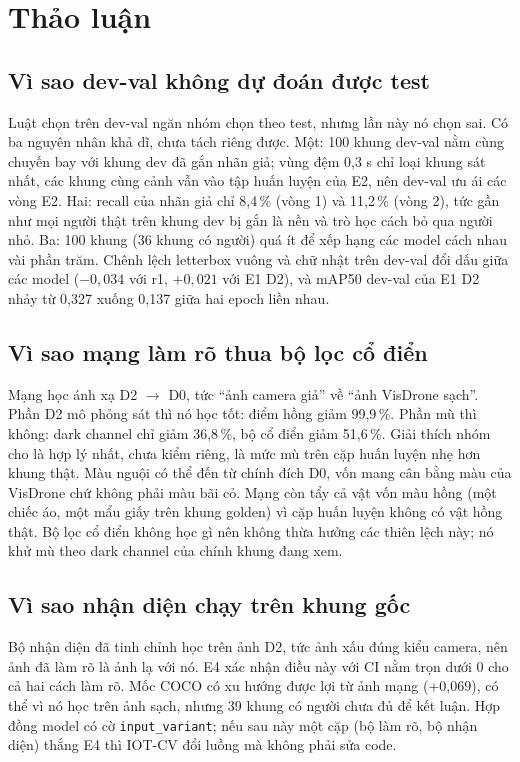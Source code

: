 \section{Thảo luận}\label{sec:thao-luan}

\subsection{Vì sao dev-val không dự đoán được test}

Luật chọn trên dev-val ngăn nhóm chọn theo test, nhưng lần này nó chọn sai. Có ba nguyên nhân khả dĩ, chưa tách riêng được. Một: 100 khung dev-val nằm cùng chuyến bay với khung dev đã gắn nhãn giả; vùng đệm 0,3 s chỉ loại khung sát nhất, các khung cùng cảnh vẫn vào tập huấn luyện của E2, nên dev-val ưu ái các vòng E2. Hai: recall của nhãn giả chỉ 8,4\,\% (vòng 1) và 11,2\,\% (vòng 2), tức gần như mọi người thật trên khung dev bị gắn là nền và trò học cách bỏ qua người nhỏ. Ba: 100 khung (36 khung có người) quá ít để xếp hạng các model cách nhau vài phần trăm. Chênh lệch letterbox vuông và chữ nhật trên dev-val đổi dấu giữa các model ($-0{,}034$ với r1, $+0{,}021$ với E1 D2), và mAP50 dev-val của E1 D2 nhảy từ 0,327 xuống 0,137 giữa hai epoch liền nhau.

\subsection{Vì sao mạng làm rõ thua bộ lọc cổ điển}

Mạng học ánh xạ D2 $\to$ D0, tức ``ảnh camera giả'' về ``ảnh VisDrone sạch''. Phần D2 mô phỏng sát thì nó học tốt: điểm hồng giảm 99,9\,\%. Phần mù thì không: dark channel chỉ giảm 36,8\,\%, bộ cổ điển giảm 51,6\,\%. Giải thích nhóm cho là hợp lý nhất, chưa kiểm riêng, là mức mù trên cặp huấn luyện nhẹ hơn khung thật. Màu nguội có thể đến từ chính đích D0, vốn mang cân bằng màu của VisDrone chứ không phải màu bãi cỏ. Mạng còn tẩy cả vật vốn màu hồng (một chiếc áo, một mẩu giấy trên khung golden) vì cặp huấn luyện không có vật hồng thật. Bộ lọc cổ điển không học gì nên không thừa hưởng các thiên lệch này; nó khử mù theo dark channel của chính khung đang xem.

\subsection{Vì sao nhận diện chạy trên khung gốc}

Bộ nhận diện đã tinh chỉnh học trên ảnh D2, tức ảnh xấu đúng kiểu camera, nên ảnh đã làm rõ là ảnh lạ với nó. E4 xác nhận điều này với CI nằm trọn dưới 0 cho cả hai cách làm rõ. Mốc COCO có xu hướng được lợi từ ảnh mạng (+0,069), có thể vì nó học trên ảnh sạch, nhưng 39 khung có người chưa đủ để kết luận. Hợp đồng model có cờ \texttt{input\_variant}; nếu sau này một cặp (bộ làm rõ, bộ nhận diện) thắng E4 thì IOT-CV đổi luồng mà không phải sửa code.

